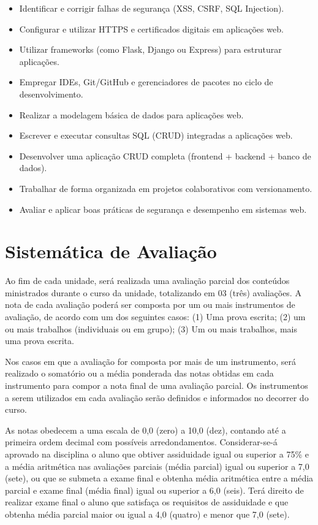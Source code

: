 \documentclass[a4paper, 12pt]{article}
\begin{document}
\begin{itemize}
\begin{itemize}
            \item Identificar e corrigir falhas de segurança (XSS, CSRF, SQL Injection).
            \item Configurar e utilizar HTTPS e certificados digitais em aplicações web.
            \item Utilizar frameworks (como Flask, Django ou Express) para estruturar aplicações.
            \item Empregar IDEs, Git/GitHub e gerenciadores de pacotes no ciclo de desenvolvimento.
            \item Realizar a modelagem básica de dados para aplicações web.
            \item Escrever e executar consultas SQL (CRUD) integradas a aplicações web.
            \item Desenvolver uma aplicação CRUD completa (frontend + backend + banco de dados).
            \item Trabalhar de forma organizada em projetos colaborativos com versionamento.
            \item Avaliar e aplicar boas práticas de segurança e desempenho em sistemas web.
        \end{itemize}
\end{itemize}

\section{Sistemática de Avaliação}

Ao fim de cada unidade, será realizada uma avaliação parcial dos conteúdos ministrados durante o curso da unidade, totalizando em 03 (três) avaliações. A nota de cada avaliação poderá ser composta por um ou mais instrumentos de avaliação, de acordo com um dos seguintes casos: (1) Uma prova escrita; (2) um ou mais trabalhos (individuais ou em grupo); (3) Um ou mais trabalhos, mais uma prova escrita.

Nos casos em que a avaliação for composta por mais de um instrumento, será realizado o somatório ou a média ponderada das notas obtidas em cada instrumento para compor a nota final de uma avaliação parcial. Os instrumentos a serem utilizados em cada avaliação serão definidos e informados no decorrer do curso.

As notas obedecem a uma escala de 0,0 (zero) a 10,0 (dez), contando até a primeira ordem decimal com possíveis arredondamentos. Considerar-se-á aprovado na disciplina o aluno que obtiver assiduidade igual ou superior a 75\% e a média aritmética nas avaliações parciais (média parcial) igual ou superior a 7,0 (sete), ou que se submeta a exame final e obtenha média aritmética entre a média parcial e exame final (média final) igual ou superior a 6,0 (seis). Terá direito de realizar exame final o aluno que satisfaça os requisitos de assiduidade e que obtenha média parcial maior ou igual a 4,0 (quatro) e menor que 7,0 (sete).
\end{document}
